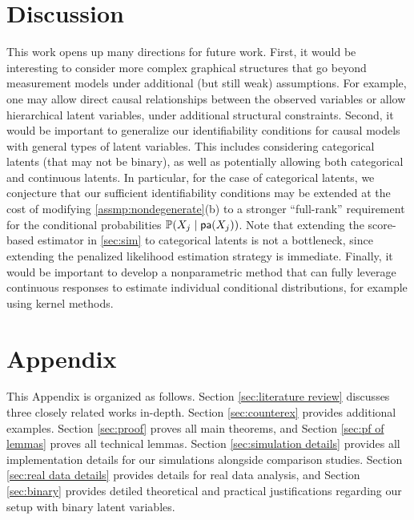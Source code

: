 \documentclass[10pt]{article} %
\newcommand{\PP}{\mathbb P}
\newcommand{\pa}{\textsf{\upshape pa}}
\begin{document}
\section{Discussion}\label{sec:discussion}
%
This work opens up many directions for future work. 
First, it would be interesting to consider more complex graphical structures that go beyond measurement models under additional (but still weak) assumptions. For example, one may allow direct causal relationships between the observed variables or allow hierarchical latent variables, under additional structural constraints. 
%
%
Second, it would be important to generalize our identifiability conditions for causal models with general types of latent variables. This includes considering categorical latents (that may not be binary), as well as potentially allowing both categorical and continuous latents. In particular, for the case of categorical latents, {we conjecture that our sufficient identifiability conditions may be extended at the cost of modifying \cref{assmp:nondegenerate}(b) to a stronger ``full-rank'' requirement for the conditional probabilities $\PP(X_j \mid \pa(X_j))$. Note that extending  the score-based estimator in \cref{sec:sim} to categorical latents is not a bottleneck, since extending the penalized likelihood estimation strategy is immediate.}
Finally, it would be important to develop a nonparametric method that can fully leverage continuous responses to estimate individual conditional distributions, for example using kernel methods.
%



%
%


%



%


\clearpage
\appendix
%
%
\section*{Appendix} This Appendix is organized as follows. Section \ref{sec:literature review} discusses three closely related works in-depth. Section \ref{sec:counterex} provides additional examples. Section \ref{sec:proof} proves all main theorems, and Section \ref{sec:pf of lemmas} proves all technical lemmas. Section \ref{sec:simulation details} provides all implementation details for our simulations alongside comparison studies. Section \ref{sec:real data details} provides details for real data analysis, and Section \ref{sec:binary} provides detiled theoretical and practical justifications regarding our setup with binary latent variables.
\end{document}
